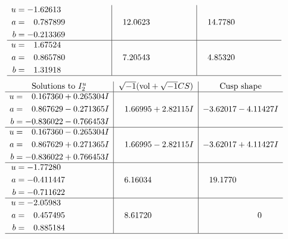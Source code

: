 \documentclass[1p]{elsarticle_modified}
\theoremstyle{definition}
\newcommand{\I}{\sqrt{-1}}
\begin{document}
$$\begin{array}{c|c|c}
\begin{aligned}
u &= -1.62613\phantom{ +0.000000I} \\
a &= \phantom{-}0.787899\phantom{ +0.000000I} \\
b &= -0.213369\phantom{ +0.000000I}\end{aligned}
 & \phantom{-}12.0623\phantom{ +0.000000I} & \phantom{-}14.7780\phantom{ +0.000000I} \\ \hline\begin{aligned}
u &= \phantom{-}1.67524\phantom{ +0.000000I} \\
a &= \phantom{-}0.865780\phantom{ +0.000000I} \\
b &= \phantom{-}1.31918\phantom{ +0.000000I}\end{aligned}
 & \phantom{-}7.20543\phantom{ +0.000000I} & \phantom{-}4.85320\phantom{ +0.000000I}\\
 \hline 
 \end{array}$$\newpage$$\begin{array}{c|c|c}  
\text{Solutions to }I^u_{2}& \I (\text{vol} + \sqrt{-1}CS) & \text{Cusp shape}\\
 \hline 
\begin{aligned}
u &= \phantom{-}0.167360 + 0.265304 I \\
a &= \phantom{-}0.867629 - 0.271365 I \\
b &= -0.836022 - 0.766453 I\end{aligned}
 & \phantom{-}1.66995 + 2.82115 I & -3.62017 - 4.11427 I \\ \hline\begin{aligned}
u &= \phantom{-}0.167360 - 0.265304 I \\
a &= \phantom{-}0.867629 + 0.271365 I \\
b &= -0.836022 + 0.766453 I\end{aligned}
 & \phantom{-}1.66995 - 2.82115 I & -3.62017 + 4.11427 I \\ \hline\begin{aligned}
u &= -1.77280\phantom{ +0.000000I} \\
a &= -0.411447\phantom{ +0.000000I} \\
b &= -0.711622\phantom{ +0.000000I}\end{aligned}
 & \phantom{-}6.16034\phantom{ +0.000000I} & \phantom{-}19.1770\phantom{ +0.000000I} \\ \hline\begin{aligned}
u &= -2.05983\phantom{ +0.000000I} \\
a &= \phantom{-}0.457495\phantom{ +0.000000I} \\
b &= \phantom{-}0.885184\phantom{ +0.000000I}\end{aligned}
 & \phantom{-}8.61720\phantom{ +0.000000I} & \phantom{-0.000000 } 0\\
 \hline 
 \end{array}$$\newpage
\end{document}
